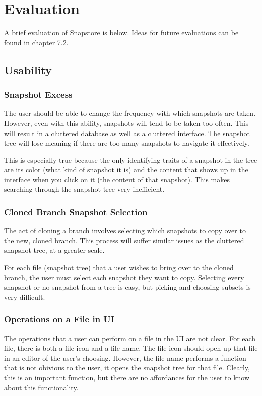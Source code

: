 \chapter{Evaluation}

A brief evaluation of Snapstore is below. Ideas for future evaluations can be found in chapter 7.2.

\section{Usability}

\subsection{Snapshot Excess}

The user should be able to change the frequency with which snapshots are taken. However, even with this ability, snapshots will tend to be taken too often. This will result in a cluttered database as well as a cluttered interface. The snapshot tree will lose meaning if there are too many snapshots to navigate it effectively. 

This is especially true because the only identifying traits of a snapshot in the tree are its color (what kind of snapshot it is) and the content that shows up in the interface when you click on it (the content of that snapshot). This makes searching through the snapshot tree very inefficient.

\subsection{Cloned Branch Snapshot Selection}

The act of cloning a branch involves selecting which snapshots to copy over to the new, cloned branch. This process will suffer similar issues as the cluttered snapshot tree, at a greater scale. 

For each file (snapshot tree) that a user wishes to bring over to the cloned branch, the user must select each snapshot they want to copy. Selecting every snapshot or no snapshot from a tree is easy, but picking and choosing subsets is very difficult.

\subsection{Operations on a File in UI}

The operations that a user can perform on a file in the UI are not clear. For each file, there is both a file icon and a file name. The file icon should open up that file in an editor of the user's choosing. However, the file name performs a function that is not obivious to the user, it opens the snapshot tree for that file. Clearly, this is an important function, but there are no affordances for the user to know about this functionality.

